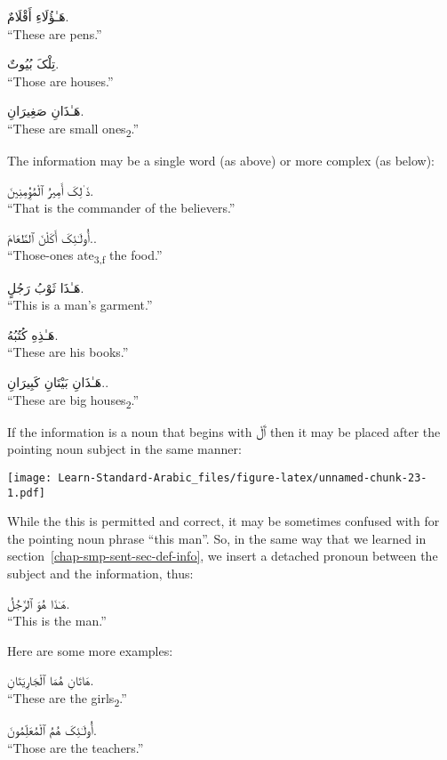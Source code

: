 \documentclass[
  10pt,
]{book}
\begin{document}
\foreignlanguage{arabic}{هَـٰؤُلَاءِ أَقْلَامٌ.}\\
\enquote{These are pens.}

\foreignlanguage{arabic}{تِلْکَ بُيُوتٌ.}\\
\enquote{Those are houses.}

\foreignlanguage{arabic}{هَـٰذَانِ صَغِيرَانِ.}\\
\enquote{These are small ones\textsubscript{2}.}

The information may be a single word (as above) or more complex (as below):

\foreignlanguage{arabic}{ذَ~ٰلِکَ أَمِيرُ ٱلْمُؤِْمِنِينَ.}\\
\enquote{That is the commander of the believers.}

\foreignlanguage{arabic}{أُولَـٰئِکَ أَکَلْنَ ٱلطَّعَامَ..}\\
\enquote{Those-ones ate\textsubscript{3,f} the food.}

\foreignlanguage{arabic}{هَـٰذَا ثَوْبُ رَجُلٍ.}\\
\enquote{This is a man's garment.}

\foreignlanguage{arabic}{هَـٰذِهِ کُتُبُهُ.}\\
\enquote{These are his books.}

\foreignlanguage{arabic}{هَـٰذَانِ بَيْتَانِ کَبِيرَانِ..}\\
\enquote{These are big houses\textsubscript{2}.}

If the information is a noun that begins with \foreignlanguage{arabic}{ٱَلْ} then it may be placed after the pointing noun subject in the same manner:

\texttt{[image: Learn-Standard-Arabic\_files/figure-latex/unnamed-chunk-23-1.pdf]}

While the this is permitted and correct, it may be sometimes confused with for the pointing noun phrase \enquote{this man}. So, in the same way that we learned in
section~\ref{chap-smp-sent-sec-def-info},
we insert a detached pronoun between the subject and the information, thus:

\foreignlanguage{arabic}{هَـٰذَا هُوَ ٱلرَّجُلُ.}\\
\enquote{This is the man.}

Here are some more examples:

\foreignlanguage{arabic}{هَاتَانِ هُمَا ٱلْجَارِيَتَانِ.}\\
\enquote{These are the girls\textsubscript{2}.}

\foreignlanguage{arabic}{أُولَـٰئِکَ هُمُ ٱلْمُعَلِّمُونَ.}\\
\enquote{Those are the teachers.}
\end{document}
